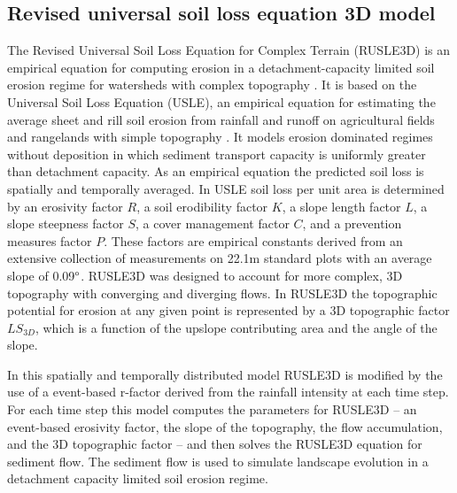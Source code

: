 \documentclass[final,3p,times,twocolumn]{elsarticle}
\begin{document}
\subsection{Revised universal soil loss equation 3D model}
\label{rusle_model} %
The Revised Universal Soil Loss Equation for Complex Terrain (RUSLE3D) 
is an empirical equation for computing erosion 
in a detachment-capacity limited soil erosion regime
for watersheds with complex topography \cite{Mitasova1996}. 
It is based on 
the Universal Soil Loss Equation (USLE),
an empirical equation for estimating the average
sheet and rill soil erosion from rainfall and runoff
on agricultural fields and rangelands with simple topography 
\cite{Wischmeier1978}. 
It models erosion dominated regimes without deposition
in which sediment transport capacity is uniformly greater than detachment capacity.
As an empirical equation the predicted soil loss 
is spatially and temporally averaged. 
In USLE soil loss per unit area is determined by 
an erosivity factor $R$,
a soil erodibility factor $K$, 
a slope length factor $L$,
a slope steepness factor $S$,
a cover management factor $C$,
and a prevention measures factor $P$.
These factors are empirical constants derived 
from an extensive collection of measurements 
on 22.1m standard plots with an average slope of 0.09$\degree$.  
%
RUSLE3D was designed to account for more complex, 3D topography 
with converging and diverging flows. 
In RUSLE3D the topographic potential for erosion at any given point 
is represented by a 3D topographic factor $LS_{3D}$,
which is a function of the upslope contributing area %
and the angle of the slope. 


In this spatially and temporally distributed model 
RUSLE3D is modified by the use of a 
event-based r-factor derived from the rainfall intensity at each time step.
%
For each time step
this model computes the parameters for RUSLE3D -- 
an event-based erosivity factor,
the slope of the topography, the flow accumulation, and
the 3D topographic factor -- and then
solves the RUSLE3D equation for sediment flow. 
The sediment flow is used to simulate landscape evolution 
in a detachment capacity limited soil erosion regime.

\end{document}

